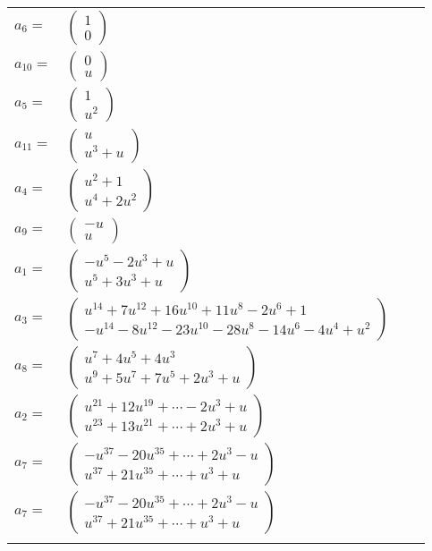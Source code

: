 \documentclass[1p]{elsarticle_modified}
\theoremstyle{definition}
\begin{document}
\begin{tabular}{m{7pt} m{180pt} m{7pt} m{180pt} }
\flushright $a_{6}=$&$\begin{pmatrix}1\\0\end{pmatrix}$ \\
\flushright $a_{10}=$&$\begin{pmatrix}0\\u\end{pmatrix}$ \\
\flushright $a_{5}=$&$\begin{pmatrix}1\\u^2\end{pmatrix}$ \\
\flushright $a_{11}=$&$\begin{pmatrix}u\\u^3+u\end{pmatrix}$ \\
\flushright $a_{4}=$&$\begin{pmatrix}u^2+1\\u^4+2 u^2\end{pmatrix}$ \\
\flushright $a_{9}=$&$\begin{pmatrix}- u\\u\end{pmatrix}$ \\
\flushright $a_{1}=$&$\begin{pmatrix}- u^5-2 u^3+u\\u^5+3 u^3+u\end{pmatrix}$ \\
\flushright $a_{3}=$&$\begin{pmatrix}u^{14}+7 u^{12}+16 u^{10}+11 u^8-2 u^6+1\\- u^{14}-8 u^{12}-23 u^{10}-28 u^8-14 u^6-4 u^4+u^2\end{pmatrix}$ \\
\flushright $a_{8}=$&$\begin{pmatrix}u^7+4 u^5+4 u^3\\u^9+5 u^7+7 u^5+2 u^3+u\end{pmatrix}$ \\
\flushright $a_{2}=$&$\begin{pmatrix}u^{21}+12 u^{19}+\cdots-2 u^3+u\\u^{23}+13 u^{21}+\cdots+2 u^3+u\end{pmatrix}$ \\
\flushright $a_{7}=$&$\begin{pmatrix}- u^{37}-20 u^{35}+\cdots+2 u^3- u\\u^{37}+21 u^{35}+\cdots+u^3+u\end{pmatrix}$\\ \flushright $a_{7}=$&$\begin{pmatrix}- u^{37}-20 u^{35}+\cdots+2 u^3- u\\u^{37}+21 u^{35}+\cdots+u^3+u\end{pmatrix}$\\&\end{tabular}
\end{document}
